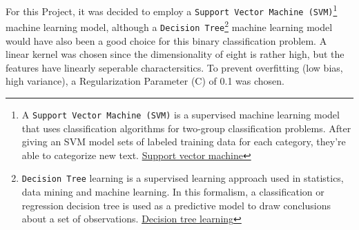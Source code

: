 For this Project, it was decided to employ a \texttt{Support Vector Machine (SVM)}\footnote{A \texttt{Support Vector Machine (SVM)} is a supervised machine learning model that uses classification algorithms for two-group classification problems. After giving an SVM model sets of labeled training data for each category, they're able to categorize new text. \href{https://en.wikipedia.org/wiki/Support\_vector\_machine}{Support vector machine}} machine learning model, although a \texttt{Decision Tree}\footnote{\texttt{Decision Tree} learning is a supervised learning approach used in statistics, data mining and machine learning. In this formalism, a classification or regression decision tree is used as a predictive model to draw conclusions about a set of observations. \href{https://en.wikipedia.org/wiki/Decision\_tree\_learning}{Decision tree learning}} machine learning model would have also been a good choice for this binary classification problem.  A linear kernel was chosen since the dimensionality of eight is rather high, but the features have linearly seperable charactersitics.  To prevent overfitting (low bias, high variance), a Regularization Parameter (C) of 0.1 was chosen.

